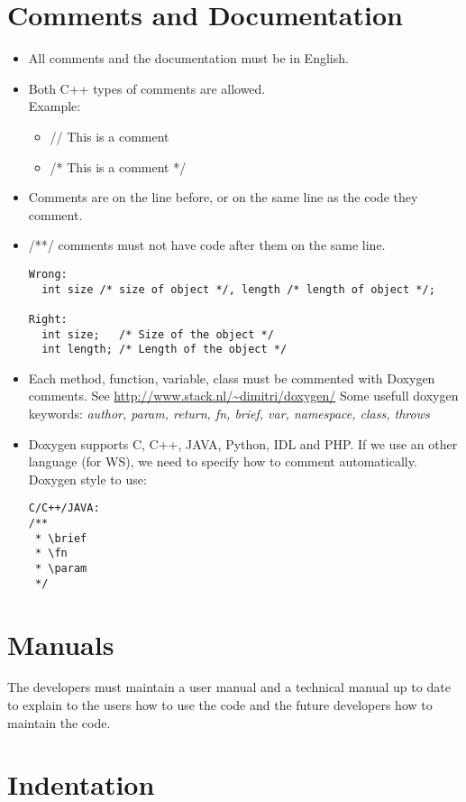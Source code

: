 \documentclass{article}
\begin{document}
\section{Comments and Documentation}
\begin{itemize}
\item All comments and the documentation must be in English.
\item Both C++ types of comments are allowed.\\
  Example: \begin{itemize}
  \item // This is a comment
  \item /* This is a comment */
  \end{itemize}
\item Comments are on the line before, or on the same line as the code they
 comment.
\item /**/ comments must not have code after them on the same 
line.\\
\begin{verbatim}
Wrong:
  int size /* size of object */, length /* length of object */;

Right:
  int size;   /* Size of the object */
  int length; /* Length of the object */
\end{verbatim}
\item Each method, function, variable, class must be commented with Doxygen 
comments. See \url{http://www.stack.nl/~dimitri/doxygen/}
Some usefull doxygen keywords: \textit{author, param, return, fn, brief, var,
 namespace, class, throws}
\item Doxygen supports C, C++, JAVA, Python, IDL and PHP. If we use an other
language (for WS), we need to specify how to comment automatically.\\
Doxygen style to use:
\begin{verbatim}
C/C++/JAVA:
/**
 * \brief
 * \fn
 * \param
 */
\end{verbatim}
\end{itemize}

\section{Manuals}
The developers must maintain a user manual and a technical manual up to date to
 explain to the users how to use the code and the future developers how to 
maintain the code.

\section{Indentation}
\end{document}
